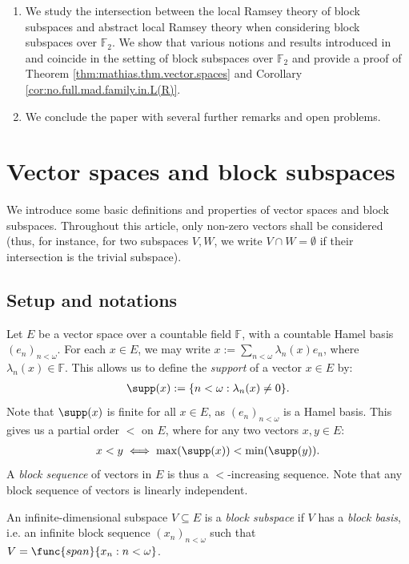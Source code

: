 \documentclass[11pt,reqno]{amsart}
\begin{document}
\begin{enumerate}
    \item[(\Sec\ref{sec:TRS.block.subspaces})] We study the intersection between the local Ramsey theory of block subspaces and abstract local Ramsey theory when considering block subspaces over $\mathbb{F}_2$. We show that various notions and results introduced in  and  coincide in the setting of block subspaces over $\mathbb{F}_2$ and provide a proof of Theorem \ref{thm:mathias.thm.vector.spaces} and Corollary \ref{cor:no.full.mad.family.in.L(R)}.
    
    \item[(\Sec\ref{sec:conclusion})] We conclude the paper with several further remarks and open problems.
\end{enumerate}

\section{Vector spaces and block subspaces}
\label{sec:setup}
We introduce some basic definitions and properties of vector spaces and block subspaces. Throughout this article, only non-zero vectors shall be considered (thus, for instance, for two subspaces $V,W$, we write $V \cap W = \emptyset$ if their intersection is the trivial subspace).

\subsection{Setup and notations}
Let $E$ be a vector space over a countable field $\mathbb{F}$, with a countable Hamel basis $(e_n)_{n<\omega}$. For each $x \in E$, we may write $x := \sum_{n<\omega} \lambda_n(x)e_n$, where $\lambda_n(x) \in \mathbb{F}$. This allows us to define the \emph{support} of a vector $x \in E$ by:
\begin{align*}
    \supp(x) := \{n < \omega : \lambda_n(x) \neq 0\}.
\end{align*}
Note that $\supp(x)$ is finite for all $x \in E$, as $(e_n)_{n<\omega}$ is a Hamel basis. This gives us a partial order $<$ on $E$, where for any two vectors $x,y \in E$:
\begin{align*}
    x < y \iff \max(\supp(x)) < \min(\supp(y)).
\end{align*}
A \emph{block sequence} of vectors in $E$ is thus a $<$-increasing sequence. Note that any block sequence of vectors is linearly independent. 

\begin{definition}
    An infinite-dimensional subspace $V \subseteq E$ is a \emph{block subspace} if $V$ has a \emph{block basis}, i.e. an infinite block sequence $(x_n)_{n<\omega}$ such that $V = \func{span}\{x_n : n < \omega\}$.
\end{definition}
\end{document}
